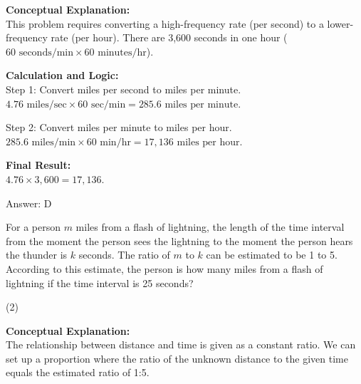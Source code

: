\documentclass[11pt,paper=a4,answers]{exam}
\begin{document}
\begin{questions}
\begin{solution}
\textbf{Conceptual Explanation:} \\
This problem requires converting a high-frequency rate (per second) to a lower-frequency rate (per hour). There are 3,600 seconds in one hour ($60 \text{ seconds/min} \times 60 \text{ minutes/hr}$).

\vspace{30pt}

\textbf{Calculation and Logic:} \\
Step 1: Convert miles per second to miles per minute. \\
$4.76 \text{ miles/sec} \times 60 \text{ sec/min} = 285.6 \text{ miles per minute}$.

\vspace{15pt}

Step 2: Convert miles per minute to miles per hour. \\
$285.6 \text{ miles/min} \times 60 \text{ min/hr} = 17,136 \text{ miles per hour}$.

\vspace{15pt}

\textbf{Final Result:} \\
$4.76 \times 3,600 = 17,136$.

\vspace{30pt}

Answer: \colorbox{yellow!100}{D}
\end{solution}

\vspace{60pt}

\question
For a person $m$ miles from a flash of lightning, the length of the time interval from the moment the person sees the lightning to the moment the person hears the thunder is $k$ seconds. The ratio of $m$ to $k$ can be estimated to be 1 to 5. According to this estimate, the person is how many miles from a flash of lightning if the time interval is 25 seconds?
\begin{tasks}(2)
\end{tasks}

\begin{solution}
\textbf{Conceptual Explanation:} \\
The relationship between distance and time is given as a constant ratio. We can set up a proportion where the ratio of the unknown distance to the given time equals the estimated ratio of 1:5.


\end{solution}
\end{questions}
\end{document}
